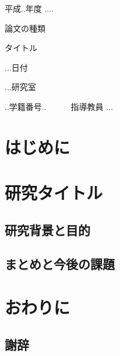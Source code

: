 \documentclass[a4paper,11pt,oneside,openany]{jsbook}
\begin{document}
%
\begin{center}
  \huge 平成..年度 ....\par
  \vspace{15mm}
  \huge 論文の種類 \par
  \vspace{15mm}
  \LARGE タイトル \par
  \vspace{100mm}
  \Large ...日付 \par
  \vspace{15mm}
  \Large ...研究室 \par
  \vspace{10mm}
  \Large ..学籍番号..　　　指導教員 ...\par
  \vspace{10mm}
\end{center}
\thispagestyle{empty}
\clearpage
\addtocounter{page}{-1}
\newpage
\setcounter{tocdepth}{3}
%
\tableofcontents
%
\chapter{はじめに}
%
\chapter{研究タイトル}
\section{研究背景と目的}
\section{}
\section{まとめと今後の課題}
\newpage
%
\chapter{おわりに}
\newpage
%
\section*{謝辞}
%
\begin{thebibliography}{99}
\end{thebibliography}
%
\end{document}

